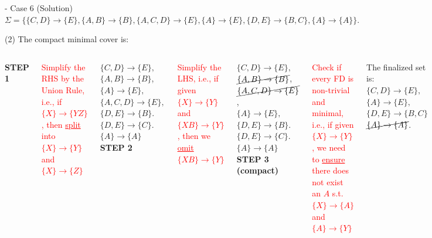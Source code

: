 \begin{frame}[fragile]{ - Case 6 (Solution)}
	$\Sigma=\{\{C,D\} \rightarrow \{E\},\{A,B\} \rightarrow \{B\}, \{A,C,D\} \rightarrow \{E\},\{A\} \rightarrow \{E\},\{D,E\} \rightarrow \{B,C\},\{A\} \rightarrow \{A\}\}.$\\\vspace{5pt}
	
	(2) The compact minimal cover is:\\\vspace{5pt}
	
	\begin{columns}[t]
	 \textbf{STEP 1}\\
	\begin{block}{}
		\tiny \textcolor{red}{Simplify the RHS by the Union Rule, i.e., if $\{X\}\rightarrow \{YZ\}$, then \underline{split} into $\{X\}\rightarrow \{Y\}$ and $\{X\}\rightarrow \{Z\}$}	
	\end{block}
	$\{C,D\} \rightarrow \{E\},$\\
	$\{A,B\} \rightarrow \{B\}$,\\
	$\{A\}  \rightarrow \{E\},$\\
	$\{A,C,D\} \rightarrow \{E\},$\\
	$\{D,E\} \rightarrow \{B\}.$\\
	$\{D,E\} \rightarrow \{C\}.$\\
	$\{A\} \rightarrow \{A\}$\\\vspace{5pt}
	 \textbf{STEP 2}\\
	\begin{block}{}
		\tiny \textcolor{red}{Simplify the LHS, i.e., if given $\{X\}\rightarrow \{Y\}$ and $\{XB\}\rightarrow \{Y\}$, then we \underline{omit} $\{XB\}\rightarrow \{Y\}$}	
	\end{block}
	$\{C,D\} \rightarrow \{E\},$\\
	$\cancel{\{A,B\} \rightarrow \{B\}}$,\\
	$\cancel{\{A,C,D\} \rightarrow \{E\}}$,\\
	$\{A\}  \rightarrow \{E\},$\\
	$\{D,E\} \rightarrow \{B\}.$\\
	$\{D,E\} \rightarrow \{C\}.$\\
	$\{A\} \rightarrow \{A\}$\\\vspace{5pt}
	  \textbf{STEP 3 (compact)}\\	
	\begin{block}{}
		\tiny \textcolor{red}{Check if every FD is non-trivial and minimal, i.e., if given $\{X\}\rightarrow \{Y\}$, we need to \underline{ensure} there does not exist an $A$ s.t. $\{X\}\rightarrow \{A\}$ and $\{A\}\rightarrow \{Y\}$}	
	\end{block}
	The finalized set is:\\
	$\{C,D\} \rightarrow \{E\},$\\
	$\{A\}  \rightarrow \{E\},$\\
	$\{D,E\} \rightarrow \{B, C\}$\\
	$\cancel{\{A\} \rightarrow \{A\}}$.
	\end{columns}
	

\end{frame}
